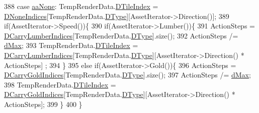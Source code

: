 \begin{DoxyCode}
{388                     \textcolor{keywordflow}{case} \hyperlink{GameDataTypes_8h_ab47668e651a3032cfb9c40ea2d60d670ac17cc5a0035320c060d7f8074143b507}{aaNone}:            TempRenderData.\hyperlink{structSAssetRenderData_a8c97c7f34d5b359f6fa23ce215a09929}{DTileIndex} = 
      \hyperlink{classCAssetRenderer_adfa7285e46e798a7d34a935bc7a6df6c}{DNoneIndices}[TempRenderData.\hyperlink{structSAssetRenderData_ae986cfe9d4238fa31fb511b40392d97f}{DType}][AssetIterator->Direction()];
389                                             \textcolor{keywordflow}{if}(AssetIterator->Speed())\{
390                                                 \textcolor{keywordflow}{if}(AssetIterator->Lumber())\{
391                                                     ActionSteps = 
      \hyperlink{classCAssetRenderer_a986dc401334deb267cb772ff0650fcb6}{DCarryLumberIndices}[TempRenderData.\hyperlink{structSAssetRenderData_ae986cfe9d4238fa31fb511b40392d97f}{DType}].size();
392                                                     ActionSteps /= \hyperlink{GameDataTypes_8h_acb2b033915f6659a71a38b5aa6e4eb42af6546049275557ce0ade2ceee042a319}{dMax};
393                                                     TempRenderData.\hyperlink{structSAssetRenderData_a8c97c7f34d5b359f6fa23ce215a09929}{DTileIndex} = 
      \hyperlink{classCAssetRenderer_a986dc401334deb267cb772ff0650fcb6}{DCarryLumberIndices}[TempRenderData.\hyperlink{structSAssetRenderData_ae986cfe9d4238fa31fb511b40392d97f}{DType}][AssetIterator->Direction() * ActionSteps]
      ;
394                                                 \}
395                                                 \textcolor{keywordflow}{else} \textcolor{keywordflow}{if}(AssetIterator->Gold())\{
396                                                     ActionSteps = 
      \hyperlink{classCAssetRenderer_aaf8c772b7d3fbe8c145282e5106749d6}{DCarryGoldIndices}[TempRenderData.\hyperlink{structSAssetRenderData_ae986cfe9d4238fa31fb511b40392d97f}{DType}].size();
397                                                     ActionSteps /= \hyperlink{GameDataTypes_8h_acb2b033915f6659a71a38b5aa6e4eb42af6546049275557ce0ade2ceee042a319}{dMax};
398                                                     TempRenderData.\hyperlink{structSAssetRenderData_a8c97c7f34d5b359f6fa23ce215a09929}{DTileIndex} = 
      \hyperlink{classCAssetRenderer_aaf8c772b7d3fbe8c145282e5106749d6}{DCarryGoldIndices}[TempRenderData.\hyperlink{structSAssetRenderData_ae986cfe9d4238fa31fb511b40392d97f}{DType}][AssetIterator->Direction() * ActionSteps];
399                                                 \}
400                                             \}
}
\end{DoxyCode}
